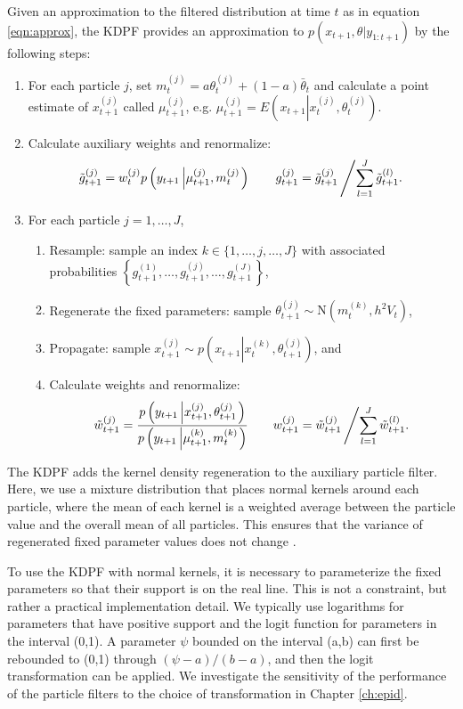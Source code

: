 Given an approximation to the filtered distribution at time $t$ as in equation \eqref{eqn:approx}, the KDPF provides an approximation to $p(x_{t+1},\theta|y_{1:t+1})$ by the following steps:
\begin{enumerate}
\item For each particle $j$, set $m_t^{(j)} = a\theta_t^{(j)} + (1-a)\bar{\theta}_t$ and calculate a point estimate of $x_{t+1}^{(j)}$ called $\mu_{t+1}^{(j)}$, e.g. $\mu_{t+1}^{(j)} = E\left(x_{t+1}\left|x_t^{(j)},\theta_t^{(j)} \right.\right)$.
\item Calculate auxiliary weights and renormalize:
\[ \tilde{g}_{t+1}^{(j)} = w_t^{(j)} p\left(y_{t+1}\left|\mu_{t+1}^{(j)},m_t^{(j)}\right.\right) \qquad g_{t+1}^{(j)} = \tilde{g}_{t+1}^{(j)}\left/ \sum_{l=1}^J \tilde{g}_{t+1}^{(l)}. \right. \]
\item For each particle $j=1,\ldots,J$,
	\begin{enumerate}
    \item Resample: sample an index $k\in\{1,\ldots,j,\ldots,J\}$ with associated probabilities $\left\{g_{t+1}^{(1)},\ldots,g_{t+1}^{(j)},\ldots,g_{t+1}^{(J)}\right\}$,
	\item Regenerate the fixed parameters: sample $\theta_{t+1}^{(j)} \sim \mbox{N}\left(m_t^{(k)}, h^2V_t \right)$,
	\item Propagate: sample $x_{t+1}^{(j)} \sim p\left(x_{t+1}\left|x_t^{(k)},\theta_{t+1}^{(j)}\right.\right)$, and
	\item Calculate weights and renormalize:
	\[ \tilde{w}_{t+1}^{(j)} = \frac{p\left(y_{t+1}\left|x_{t+1}^{(j)},\theta_{t+1}^{(j)}\right.\right)}{p\left(y_{t+1}\left|\mu_{t+1}^{(k)},m_t^{(k)}\right.\right)}
	\qquad
	w_{t+1}^{(j)} = \tilde{w}_{t+1}^{(j)}\left/\sum_{l=1}^J \tilde{w}_{t+1}^{(l)}. \right. \]
	\end{enumerate}
\end{enumerate}
The KDPF adds the kernel density regeneration to the auxiliary particle filter. Here, we use a mixture distribution that places normal kernels around each particle, where the mean of each kernel is a weighted average between the particle value and the overall mean of all particles. This ensures that the variance of regenerated fixed parameter values does not change \citep{Liu:West:comb:2001}.

To use the KDPF with normal kernels, it is necessary to parameterize the fixed parameters so that their support is on the real line. This is not a constraint, but rather a practical implementation detail. We typically use logarithms for parameters that have positive support and the logit function for parameters in the interval (0,1). A parameter $\psi$ bounded on the interval (a,b) can first be rebounded to (0,1) through $(\psi-a)/(b-a)$, and then the logit transformation can be applied. We investigate the sensitivity of the performance of the particle filters to the choice of transformation in Chapter \ref{ch:epid}.

